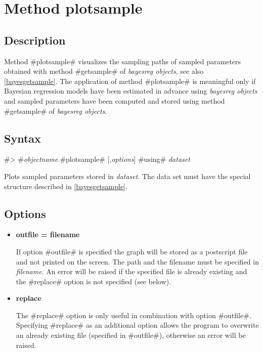 \section{Method plotsample}
\label{graphplotsample} 
 

\subsection*{Description}

Method #plotsample# visualizes the sampling paths of sampled
parameters obtained with method #getsample# of {\em bayesreg
objects}, see also \autoref{bayesgetsample}. The application of
method #plotsample# is meaningful only if Bayesian regression
models have been estimated in advance using {\em bayesreg objects}
and sampled parameters have been computed and stored using method
#getsample# of {\em bayesreg objects}.

\subsection*{Syntax}

#> #{\em objectname}.#plotsample# [,{\em options}] #using# {\em dataset}

Plots sampled parameters stored in {\em dataset}. The data set
must have the special structure described in
\autoref{bayesgetsample}.

\subsection*{Options}

\begin{itemize}
\item {\bf outfile = filename}

If option #outfile# is specified the graph will be stored as a
postscript file and not printed on the screen. The path and the
filename must be specified in {\em filename}. An error will be
raised if the specified file is already existing and the #replace#
option is not specified (see below). \item {\bf replace}

The #replace# option is only useful in combination with option
#outfile#. Specifying #replace# as an additional option allows the
program to overwrite an already existing file (specified in
#outfile#), otherwise an error will be raised.
\end{itemize}
